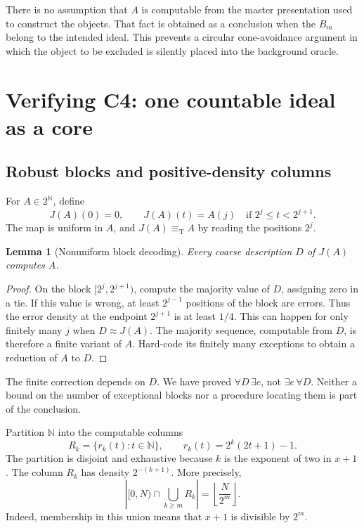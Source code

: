 \documentclass[11pt,letterpaper]{article}
\theoremstyle{plain}
\newtheorem{lemma}[theorem]{Lemma}
\theoremstyle{definition}
\theoremstyle{remark}
\numberwithin{equation}{section}
\newcommand{\N}{\mathbb N}
\newcommand{\Cantor}{2^{\N}}
\newcommand{\eqT}{\equiv_{\mathrm T}}
\begin{document}
There is no assumption that $A$ is computable from the master presentation
used to construct the objects. That fact is obtained as a conclusion when
the $B_m$ belong to the intended ideal. This prevents a circular
cone-avoidance argument in which the object to be excluded is silently
placed into the background oracle.

\section{Verifying C4: one countable ideal as a core}\label{cr11:sec:ideal}

\subsection{Robust blocks and positive-density columns}

For $A\in\Cantor$, define
\begin{equation}\label{cr11:eq:block}
 J(A)(0)=0,\qquad J(A)(t)=A(j)\quad\text{if }2^j\leq t<2^{j+1}.
\end{equation}
The map is uniform in $A$, and $J(A)\eqT A$ by reading the positions $2^j$.

\begin{lemma}[Nonuniform block decoding]\label{cr11:lem:block}
Every coarse description $D$ of $J(A)$ computes $A$.
\end{lemma}
\begin{proof}
On the block $[2^j,2^{j+1})$, compute the majority value of $D$, assigning
zero in a tie. If this value is wrong, at least $2^{j-1}$ positions of the
block are errors. Thus the error density at the endpoint $2^{j+1}$ is at
least $1/4$. This can happen for only finitely many $j$ when $D\approx J(A)$.
The majority sequence, computable from $D$, is therefore a finite variant
of $A$. Hard-code its finitely many exceptions to obtain a reduction of
$A$ to $D$.
\end{proof}

The finite correction depends on $D$. We have proved
$\forall D\,\exists e$, not $\exists e\,\forall D$. Neither a bound on the
number of exceptional blocks nor a procedure locating them is part of the
conclusion.

Partition $\N$ into the computable columns
\begin{equation}\label{cr11:eq:columns}
 R_k=\{r_k(t):t\in\N\},\qquad
 r_k(t)=2^k(2t+1)-1.
\end{equation}
The partition is disjoint and exhaustive because $k$ is the exponent of two
in $x+1$. The column $R_k$ has density $2^{-(k+1)}$. More precisely,
\begin{equation}\label{cr11:eq:tailcount}
 \left|[0,N)\cap\bigcup_{k\geq m}R_k\right|
                  =\left\lfloor\frac{N}{2^m}\right\rfloor.
\end{equation}
Indeed, membership in this union means that $x+1$ is divisible by $2^m$.
\end{document}
